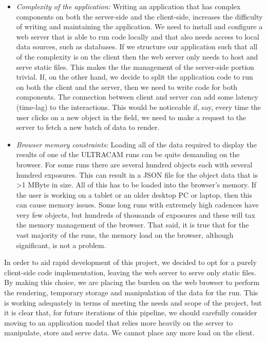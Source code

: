 \begin{itemize}
  \item \emph{Complexity of the application:} Writing an application that has complex components on both the server-side and the client-side, increases the difficulty of writing and maintaining the application. We need to install and configure a web server that is able to run code locally and that also needs access to local data sources, such as databases. If we structure our application such that all of the complexity is on the client then the web server only needs to host and serve static files. This makes the the management of the server-side portion trivial. If, on the other hand, we decide to split the application code to run on both the client and the server, then we need to write code for both components. The connection between client and server can add some latency (time-lag) to the interactions. This would be noticeable if, say, every time the user clicks on a new object in the field, we need to make a request to the server to fetch a new batch of data to render.  

  \item \emph{Browser memory constraints:} Loading all of the data required to display the results of one of the ULTRACAM runs can be quite demanding on the browser. For some runs there are several hundred objects each with several hundred exposures. This can result in a JSON file for the object data that is \textgreater 1 MByte in size. All of this has to be loaded into the browser's memory. If the user is working on a tablet or an older desktop PC or laptop, then this can cause memory issues. Some long runs with extremely high cadences have very few objects, but hundreds of thousands of exposures and these will tax the memory management of the browser. That said, it is true that for the vast majority of the runs, the memory load on the browser, although significant, is not a problem. 
\end{itemize}

In order to aid rapid development of this project, we decided to opt for a purely client-side code implementation, leaving the web server to serve only static files. By making this choice, we are placing the burden on the web browser to perform the rendering, temporary storage and manipulation of the data for the run. This is working adequately in terms of meeting the needs and scope of the project, but it is clear that, for future iterations of this pipeline, we should carefully consider moving to an application model that relies more heavily on the server to manipulate, store and serve data. We cannot place any more load on the client. 

